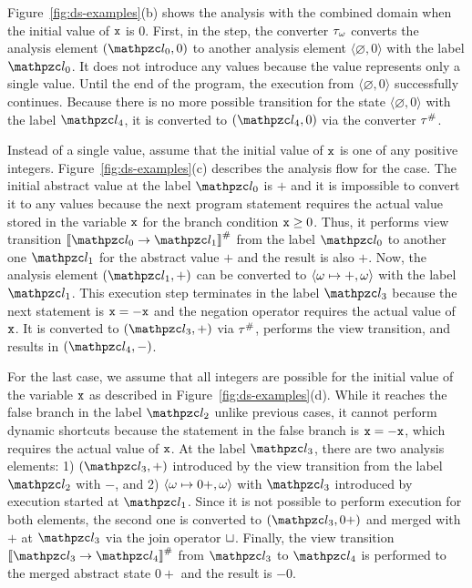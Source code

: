 Figure~\ref{fig:ds-examples}(b) shows the analysis with the combined domain when
the initial value of $\texttt{x}$ is $0$.  First, in the  step,
the converter ${\tau}_\omega$ converts the analysis element $(\lab_0, 0)$ to
another analysis element $\langle \varnothing, 0 \rangle$ with the label
$\lab_0$.  It does not introduce any {\sealed} values because
the value represents only a single value.  Until the end of the program, the
{\sealed} execution from $\langle \varnothing, 0 \rangle$ successfully
continues.  Because there is no more possible {\sealed} transition for the
{\sealed} state $\langle \varnothing, 0 \rangle$ with the label $\lab_4$,
it is converted to $(\lab_4, 0)$ via the converter ${\tau}^{\#}$.

Instead of a single value, assume that the initial value of $\texttt{x}$ is one of
any positive integers.  Figure~\ref{fig:ds-examples}(c) describes the analysis
flow for the case.  The initial abstract value at the label $\lab_0$ is
$+$ and it is impossible to convert it to any {\sealed} values because the
next program statement requires the actual value stored in the variable $\texttt{x}$
for the branch condition $\texttt{x} \geq 0$.  Thus, it performs view transition
$\viewtrans{\lab_0}{\lab_1}$ from the label $\lab_0$ to another one $\lab_1$ for
the abstract value $+$ and the result is also $+$.  Now, the analysis element
$(\lab_1, +)$ can be converted to $\langle \omega \mapsto +, \omega \rangle$
with the label $\lab_1$.  This {\sealed} execution step terminates in the
label $\lab_3$ because the next statement is $\texttt{x} = -\texttt{x}$ and the negation
operator requires the actual value of $\texttt{x}$.  It is converted to $(\lab_3, +)$ via ${\tau}^{\#}$,
performs the view transition, and results in $(\lab_4, -)$.

For the last case, we assume that all integers are possible for the initial
value of the variable $\texttt{x}$ as described in Figure~\ref{fig:ds-examples}(d).
While it reaches the false branch in the label $\lab_2$ unlike previous cases,
it cannot perform dynamic shortcuts because the statement in the false
branch is $\texttt{x} = -\texttt{x}$, which requires the actual value of $\texttt{x}$.
At the label $\lab_3$, there are two analysis
elements: 1) $(\lab_3, +)$ introduced by the view transition from the label $\lab_2$
with $-$, and 2) $\langle \omega \mapsto 0+, \omega \rangle$ with $\lab_3$
introduced by {\sealed} execution started at $\lab_1$.  Since it
is not possible to perform {\sealed} execution for both elements, the
second one is converted to $(\lab_3, 0+)$ and merged with $+$ at $\lab_3$ via the
join operator $\sqcup$.  Finally, the view transition
$\viewtrans{\lab_3}{\lab_4}$ from $\lab_3$ to $\lab_4$ is performed to the
merged abstract state $0+$ and the result is $-0$.

